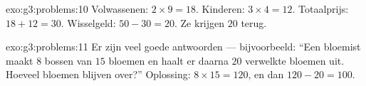 \begin{solution}{exo:g3:problems:10}
Volwassenen: $2 \times 9 = 18$. Kinderen: $3 \times 4 = 12$. Totaalprijs:
$18 + 12 = 30$. Wisselgeld: $50 - 30 = 20$. Ze krijgen $20$ terug.
\end{solution}

\begin{solution}{exo:g3:problems:11}
Er zijn veel goede antwoorden --- bijvoorbeeld: ``Een bloemist maakt $8$
bossen van $15$ bloemen en haalt er daarna $20$ verwelkte bloemen uit.
Hoeveel bloemen blijven over?'' Oplossing: $8 \times 15 = 120$, en dan
$120 - 20 = 100$.
\end{solution}
